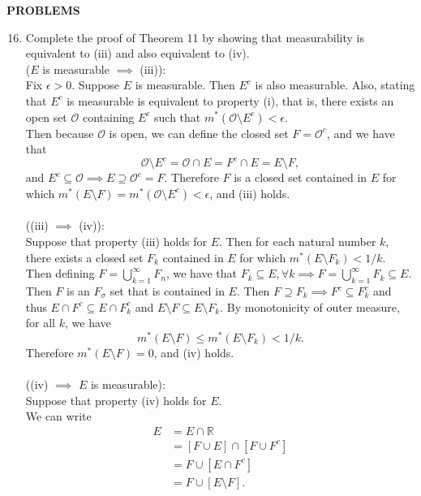 \begin{center}
	\textbf{PROBLEMS}
\end{center}
\begin{enumerate}
	\setcounter{enumi}{15}
	\item Complete the proof of Theorem 11 by showing that measurability is equivalent to (iii) and also equivalent to (iv).\\
	($E$ is measurable $\implies$ (iii)):\\
	Fix $\epsilon>0$.
	Suppose $E$ is measurable. Then $E^c$ is also measurable.
	Also, stating that $E^c$ is measurable is equivalent to property (i), that is, there exists an open set $\mathcal{O}$ containing $E^c$ such that $m^*(\mathcal{O}\setminus E^c)<\epsilon$.\\
	Then because $\mathcal{O}$ is open, we can define the closed set $F=\mathcal{O}^c$, and we have that 
	\[
		\mathcal{O}\setminus E^c = \mathcal{O}\cap E = F^c\cap E = E\setminus F,
	\]
	and $E^c\subseteq \mathcal{O}\implies E\supseteq \mathcal{O}^c=F$.
	Therefore $F$ is a closed set contained in $E$ for which $m^*(E\setminus F)=m^*(\mathcal{O}\setminus E^c)<\epsilon$, and (iii) holds.\\
	\\((iii) $\implies$ (iv)):\\
	Suppose that property (iii) holds for $E$.
	Then for each natural number $k$, there exists a closed set $F_k$ contained in $E$ for which $m^*(E\setminus F_k)<1/k$.
	\\Then defining $F=\bigcup_{k=1}^\infty F_n$, we have that $F_k\subseteq E,\forall k\implies F=\bigcup_{k=1}^\infty F_k \subseteq E$.
	Then $F$ is an $F_\sigma$ set that is contained in $E$.
	Then $F\supseteq F_k\implies F^c\subseteq F_k^c$ and thus $E\cap F^c\subseteq E\cap F_k^c$ and $E\setminus F\subseteq E\setminus F_k$.
	By monotonicity of outer measure, for all $k$, we have 
	\[
		m^*(E\setminus F)\le m^*(E\setminus F_k)<1/k.	
	\]
	Therefore $m^*(E\setminus F)=0$, and (iv) holds.\\
	\\((iv) $\implies$ $E$ is measurable):\\
	Suppose that property (iv) holds for $E$.\\
	We can write
	\begin{align*}
		E&=E\cap\mathbb{R}\\
		&=[F\cup E]\cap[F\cup F^c]\\
		&=F\cup [E\cap F^c]\\
		&=F\cup [E\setminus F].
	\end{align*}

\end{enumerate}
